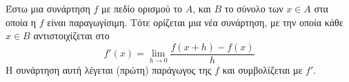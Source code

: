Έστω μια συνάρτηση $f$ με πεδίο ορισμού το $Α$, και $Β$ το σύνολο των $x\in A$ στα οποία η $f$ είναι παραγωγίσιμη. Τότε ορίζεται μια νέα συνάρτηση, με την οποία κάθε $x\in B$ αντιστοιχίζεται στο 
\[ f'(x)=\lim_{h\to 0}\frac{f(x+h)-f(x)}{h} \]
Η συνάρτηση αυτή λέγεται (πρώτη) παράγωγος της $f$ και συμβολίζεται με $f'$.
